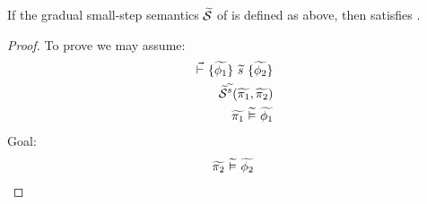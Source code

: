 \begin{theorem}[]
    If the gradual small-step semantics $\widetilde{\mathcal{S}}$ of \gvl is defined as above, then \gvl satisfies .
\end{theorem}
\begin{proof}
    To prove  we may assume:
    \begin{align}
    {} \,\,\vec{\vdash}\,\, \{{\widetilde{\phi_1}}\} ~{\widetilde{s}}~ \{{\widetilde{\phi_2}}\}\\
    \label{frm:tmp0}
    \widetilde{\mathcal{S}}^{\widetilde{s}}(\widetilde{\pi_1}, \widetilde{\pi_2})\\
    \label{frm:tmp1}
    \widetilde{\pi_1} \,\,\widetilde{\vDash}\,\, \widetilde{\phi_1}
    \label{frm:tmp2}
    \end{align}
    Goal: 
    \begin{align*}
    \widetilde{\pi_2} \,\,\widetilde{\vDash}\,\, \widetilde{\phi_2}
    \label{frm:tmp3}
    \end{align*}
    

\end{proof}
